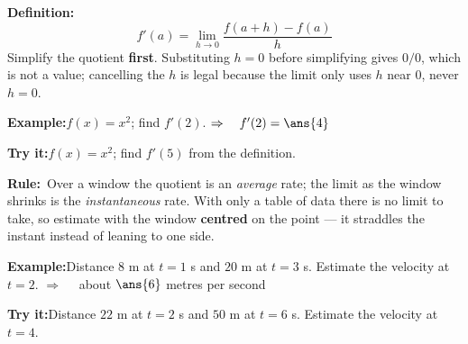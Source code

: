\documentclass[12pt]{article}
\begin{document}


\begin{formulabox}\textbf{Definition:}
\[
f'(a) = \lim_{h \to 0} \frac{f(a+h) - f(a)}{h}
\]
Simplify the quotient \textbf{first}. Substituting $h = 0$ before simplifying
gives $0/0$, which is not a value; cancelling the $h$ is legal because the
limit only uses $h$ near $0$, never $h = 0$.
\end{formulabox}

\begin{examplebox}\textbf{Example:}\quad $f(x) = x^2$; find $f'(2)$.
$\Rightarrow\quad f'(2) = \ans{4}$
\end{examplebox}

\begin{tryitbox}\textbf{Try it:}\quad $f(x) = x^2$; find $f'(5)$ from the
definition.\\[2pt]
\end{tryitbox}


\begin{formulabox}\textbf{Rule:}\ Over a window the quotient is an
\emph{average} rate; the limit as the window shrinks is the
\emph{instantaneous} rate. With only a table of data there is no limit to take,
so estimate with the window \textbf{centred} on the point --- it straddles the
instant instead of leaning to one side.
\end{formulabox}

\begin{examplebox}\textbf{Example:}\quad Distance $8$ m at $t = 1$ s and
$20$ m at $t = 3$ s. Estimate the velocity at $t = 2$.
$\Rightarrow\quad$ about $\ans{6}$ metres per second
\end{examplebox}

\begin{tryitbox}\textbf{Try it:}\quad Distance $22$ m at $t = 2$ s and $50$ m
at $t = 6$ s. Estimate the velocity at $t = 4$.\\[2pt]
\end{tryitbox}
\end{document}
